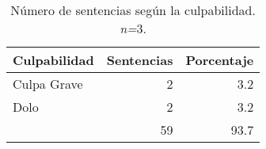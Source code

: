 \begin{table}[H]
\centering
\caption{Número de sentencias según la culpabilidad. \textit{n=}3.} 
\label{tab:culpabilidad}
\begin{tabular}{lrr}
  \hline
Culpabilidad & Sentencias & Porcentaje \\ 
  \hline
Culpa Grave &  2 & 3.2 \\ 
  Dolo &  2 & 3.2 \\ 
   & 59 & 93.7 \\ 
   \hline
\end{tabular}
\end{table}
